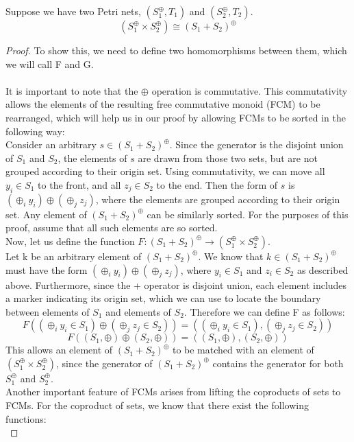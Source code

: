 \begin{lemma}
Suppose we have two Petri nets, $(S_1^\oplus, T_1)$ and $(S_2^\oplus, T_2)$.\\ 
\[(S_1 ^\oplus \times S_2 ^\oplus) \cong (S_1 + S_2)^\oplus\]
\begin{proof}
To show this, we need to define two homomorphisms between them, which we will call F and G.\\
\bigskip\\
It is important to note that the $\oplus$ operation is commutative. This commutativity allows the elements of the resulting free commutative monoid (FCM) to be rearranged, which will help us in our proof by allowing FCMs to be sorted in the following way:\bigskip\\
Consider an arbitrary $s \in (S_1 + S_2)^\oplus$. Since the generator is the disjoint union of $S_1$ and $S_2$, the elements of $s$ are drawn from those two sets, but are not grouped according to their origin set. Using commutativity, we can move all $y_i \in S_1$ to the front, and all $z_j \in S_2$ to the end. Then the form of $s$ is $(\oplus_i y_i) \oplus (\oplus_j z_j)$, where the elements are grouped according to their origin set. Any element of $(S_1 + S_2)^\oplus$ can be similarly sorted. For the purposes of this proof, assume that all such elements are so sorted.\bigskip \\
Now, let us define the function $F: (S_1 + S_2)^\oplus \to (S_1 ^\oplus \times S_2 ^\oplus)$.\\
Let k be an arbitrary element of $(S_1 + S_2)^\oplus$. We know that $k \in (S_1 + S_2)^\oplus$ must have the form $(\oplus_i y_i) \oplus (\oplus_j z_j)$, where $y_i \in S_1$ and $z_i \in S_2$ as described above. Furthermore, since the + operator is disjoint union, each element includes a marker indicating its origin set, which we can use to locate the boundary between elements of $S_1$ and elements of $S_2$. Therefore we can define F as follows:\\
\[F((\oplus_i y_i \in S_1) \oplus (\oplus_j z_j \in S_2)) = ((\oplus_i y_i \in S_1), (\oplus_j z_j \in S_2))\]
\[F((S_1, \oplus) \oplus (S_2, \oplus)) = ((S_1, \oplus), (S_2, \oplus))\]
This allows an element of $(S_1 + S_2)^\oplus$ to be matched with an element of $(S_1 ^\oplus \times S_2 ^\oplus)$, since the generator of $(S_1 + S_2)^\oplus$ contains the generator for both $S_1^\oplus$ and $S_2^\oplus$.\bigskip\\ 
Another important feature of FCMs arises from lifting the coproducts of sets to FCMs. For the coproduct of sets, we know that there exist the following functions:\\

\end{proof}
\end{lemma}
